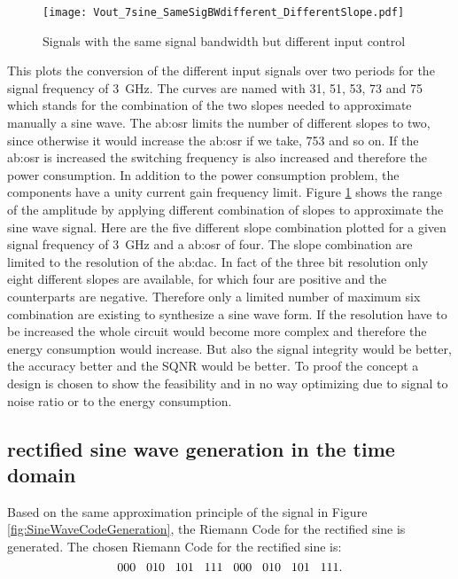 \begin{figure}[htb!]
	\centering
  \texttt{[image: Vout\_7sine\_SameSigBWdifferent\_DifferentSlope.pdf]}
	\caption{Signals with the same signal bandwidth but different input control}
	\label{fig:SameSigBWDifSlope}
\end{figure}

This plots the conversion of the different input signals over two periods for the signal frequency of \SI{3}{\GHz}.
The curves are named with 31, 51, 53, 73 and 75 which stands for the combination of the two slopes needed to approximate manually a sine wave.
The \gls{ab:osr} limits the number of different slopes to two, since otherwise it would increase the \gls{ab:osr} if we take, 753 and so on.
If the \gls{ab:osr} is increased the switching frequency is also increased and therefore the power consumption.
In addition to the power consumption problem, the components have a unity current gain frequency limit.
Figure \ref{fig:SameSigBWDifSlope} shows the range of the amplitude by applying different combination of slopes to approximate the sine wave signal.
Here are the five different slope combination plotted for a given signal frequency of \SI{3}{\GHz} and a \gls{ab:osr} of four.
The slope combination are limited to the resolution of the \gls{ab:dac}.
In fact of the three bit resolution only eight different slopes are available, for which four are positive and the counterparts are negative.
Therefore only a limited number of maximum six combination are existing to synthesize a sine wave form.
If the resolution have to be increased the whole circuit would become more complex and therefore the energy consumption would increase.
But also the signal integrity would be better, the accuracy better and the SQNR would be better.
To proof the concept a design is chosen to show the feasibility and in no way optimizing due to signal to noise ratio or to the energy consumption.

\subsection{rectified sine wave generation in the time domain}
Based on the same approximation principle of the signal in Figure \ref{fig:SineWaveCodeGeneration}, the Riemann Code for the rectified sine is generated. 
The chosen Riemann Code for the rectified sine is:
\begin{equation}
 000\hspace{.3cm} 010\hspace{.3cm} 101\hspace{.3cm} 111\hspace{.3cm} 000\hspace{.3cm} 010\hspace{.3cm} 101\hspace{.3cm} 111.
\end{equation}
\label{eq:RiemannCodeRectSine}


